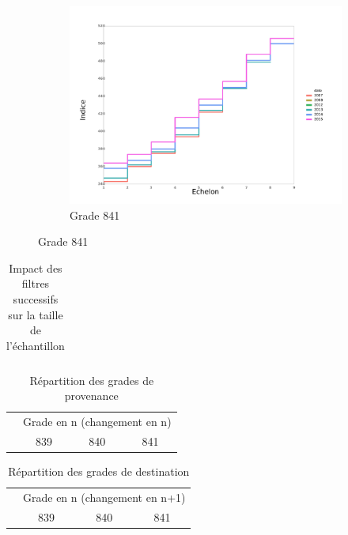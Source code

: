 \documentclass[11pt,a4paper]{article}
\begin{document}
\begin{figure}[ht]
\begin{subfigure}[b]{0.33\linewidth}
  \end{subfigure}%
  \begin{subfigure}[b]{0.33\linewidth}
        \caption{Grade 841} 
    \label{echelon_by_neg_2} 
    \centering
    \includegraphics[width=1\linewidth]{AS_841_grille_by_neg.pdf} 
  \end{subfigure}%

\end{figure}



\begin{table}[h!]
\centering
\caption{Impact des filtres successifs sur la taille de l'échantillon} 
\label{filters_AS}
\begin{tabular}{lcc}
\toprule

\bottomrule
\end{tabular}
\end{table}


\begin{table}[h!]
\centering
\caption{Répartition des grades de provenance} 
\label{entry}
\begin{tabular}{lccc}
\toprule
 & \multicolumn{3}{c}{Grade en n (changement en n)} \\
 & 839 & 840 & 841 \\ 
  \hline
  
   \hline
\bottomrule
\end{tabular}
\end{table}

\medskip


\begin{table}[h!]
\centering
\caption{Répartition des grades de destination} 
\label{exit}
\begin{tabular}{lccc}
\toprule
 & \multicolumn{3}{c}{Grade en n (changement en n+1)} \\
 & 839 & 840 & 841  \\ 
  \hline
  
   \hline
\bottomrule
\end{tabular}
\end{table}
\medskip
\end{document}
